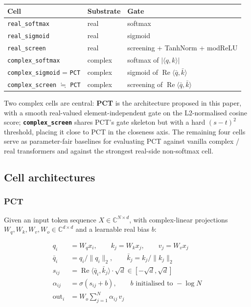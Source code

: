 \documentclass[11pt,a4paper]{article}
\theoremstyle{plain}
\theoremstyle{definition}
\renewcommand{\Re}{\operatorname{Re}}
\begin{document}
\begin{table}[H]
\centering
\footnotesize
\setlength{\tabcolsep}{10pt}
\renewcommand{\arraystretch}{1.1}
\begin{tabular}{|l|l|l|}
\hline
Cell & Substrate & Gate \\
\hline
\texttt{real\_softmax} & real & softmax \\
\hline
\texttt{real\_sigmoid} & real & sigmoid \\
\hline
\texttt{real\_screen} & real & screening + TanhNorm + modReLU \\
\hline
\texttt{complex\_softmax} & complex & softmax of $|\langle q, k\rangle|$ \\
\hline
\texttt{complex\_sigmoid} = \texttt{PCT} & complex & sigmoid of $\Re\langle \bar{q}, \bar{k}\rangle$ \\
\hline
\texttt{complex\_screen} $\fallingdotseq$ \texttt{PCT} & complex & screening of $\Re\langle \bar{q}, \bar{k}\rangle$ \\
\hline
\end{tabular}
\end{table}

Two complex cells are central: \textbf{PCT} is the architecture proposed in this paper, with a smooth real-valued element-independent gate on the L2-normalised cosine score; \textbf{\texttt{complex\_screen}} shares PCT's gate skeleton but with a hard $(s-t)^2$ threshold, placing it close to PCT in the closeness axis. The remaining four cells serve as parameter-fair baselines for evaluating PCT against vanilla complex / real transformers and against the strongest real-side non-softmax cell.

\subsection{Cell architectures}
\subsubsection{PCT}
Given an input token sequence $X \in \mathbb{C}^{N \times d}$, with complex-linear projections $W_q, W_k, W_v, W_o \in \mathbb{C}^{d \times d}$ and a learnable real bias $b$:

\begin{align*}
q_i &= W_q x_i, \qquad k_j = W_k x_j, \qquad v_j = W_v x_j \\
\bar{q}_i &= q_i / \|q_i\|_2, \qquad \bar{k}_j = k_j / \|k_j\|_2 \\
s_{ij} &= \Re\langle \bar{q}_i, \bar{k}_j \rangle \cdot \sqrt{d} \in [-\sqrt{d}, \sqrt{d}] \\
\alpha_{ij} &= \sigma(s_{ij} + b), \qquad b \text{ initialised to } -\log N \\
\mathrm{out}_i &= W_o \sum_{j=1}^{N} \alpha_{ij} \, v_j
\end{align*}
\end{document}
